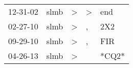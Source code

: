 \begin{supertabular}{lllll}
 12-31-02 &  slmb &  \textgreater &  \textgreater &    end \\
 02-27-10 &  slmb &  \textgreater &             , &    2X2 \\
 09-29-10 &  slmb &  \textgreater &             , &    FIR \\
 04-26-13 &  slmb &  \textgreater &               &  *CQ2* \\
\end{supertabular}
